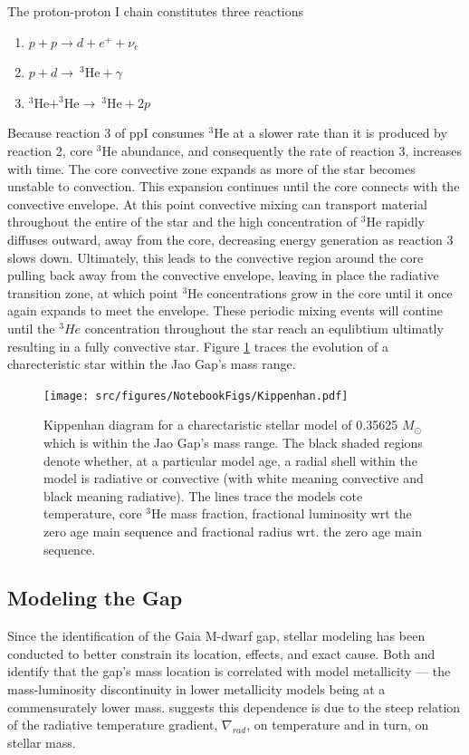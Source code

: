 The proton-proton I chain constitutes three reactions 
\begin{enumerate} 
	\item $p + p \longrightarrow d + e^{+} + \nu_{e}$
	\item $p + d \longrightarrow \ ^{3}\text{He} + \gamma$
	\item $^{3}\text{He} + ^{3}\text{He} \longrightarrow \ ^{3}\text{He} + 2p$ 
\end{enumerate} 
Because reaction 3 of ppI consumes $^{3}$He at a slower rate than it is
produced by reaction 2, core $^{3}$He abundance, and consequently the rate of
reaction 3, increases with time. The core convective zone expands as more of
the star becomes unstable to convection. This expansion continues until the
core connects with the convective envelope. At this point convective mixing can
transport material throughout the entire of the star and the high concentration
of $^{3}$He rapidly diffuses outward, away from the core, decreasing energy
generation as reaction 3 slows down. Ultimately, this leads to the convective
region around the core pulling back away from the convective envelope, leaving
in place the radiative transition zone, at which point $^{3}$He concentrations
grow in the core until it once again expands to meet the envelope.  These
periodic mixing events will contine until the $^{3}He$ concentration throughout
the star reach an equlibtium ultimatly resulting in a fully convective star.
Figure \ref{fig:Kippenhan1} traces the evolution of a charecteristic star
within the Jao Gap's mass range.

\begin{figure}
	\centering
	\texttt{[image: src/figures/NotebookFigs/Kippenhan.pdf]}
	\caption{Kippenhan diagram for a charectaristic stellar model of 0.35625
	$M_{\odot}$ which is within the Jao Gap's mass range. The black shaded
	regions denote whether, at a particular model age, a radial shell within
	the model is radiative or convective (with white meaning convective and
	black meaning radiative). The lines trace the models cote temperature, core
	$^{3}$He mass fraction, fractional luminosity wrt the zero age main
	sequence and fractional radius wrt. the zero age main sequence.}
	\label{fig:Kippenhan1}
\end{figure}


\subsection{Modeling the Gap}
Since the identification of the Gaia M-dwarf gap, stellar modeling has been
conducted to better constrain its location, effects, and exact cause.
Both \citet{Mansfield2021} and \citet{Feiden2021} identify that the gap's mass
location is correlated with model metallicity --- the mass-luminosity
discontinuity in lower metallicity models being at a commensurately lower mass.
\citet{Feiden2021} suggests this dependence is due to the steep relation of
the radiative temperature gradient, $\nabla_{rad}$, on temperature and in turn,
on stellar mass.

